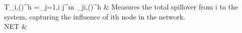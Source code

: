 \documentclass[
  letterpaper,
  DIV=11,
  numbers=noendperiod]{scrartcl}
\begin{document}
\begin{longtable}[]
                                                                                                                                                                                                                                                                                                                                                                                                                                                                                                                                                                                                                                                                                                                                                                                                                                                                                                                                                                                                                                                                                                              T_{\cdot \leftarrow i,(\tau)}^h =\sum_{j=1,i \ne j}^m \theta_{j\leftarrow i,(\tau)}^h                                                                                                                                                     
                                                                                                                                                                                                                                                                                                                                                                                                                                                                                                                                                                                                                                                                                                                                                                                                                                                                                                                                                                                                                                                                                                              \)
& Measures the total spillover from i to the system, capturing the
influence of ith node in the network. \\
NET &

\end{longtable}
\end{document}
